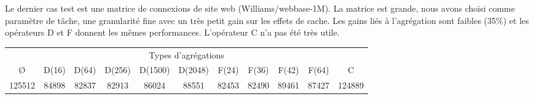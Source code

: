 Le dernier cas test est une matrice de connexions de site web (Williams/webbase-1M).
%
La matrice est grande, nous avons choisi comme paramètre de tâche, une granularité fine avec un très petit gain sur les effets de cache.
%
Les gains liés à l'agrégation sont faibles (35\%) et les opérateurs D et F donnent les mêmes performances.
%
L'opérateur C n'a pas été très utile.


\begin{center}
  \begin{tabular}{|c|c|c|c|c|c|c|c|c|c|c|}
    \hline
    \multicolumn{11}{|c|}{Types d'agrégations}\\
    \O & D(16) & D(64) & D(256) & D(1500) & D(2048) & F(24) & F(36) & F(42) & F(64) & C \\
    \hline
    125512 & 84898 & 82837 & 82913 & 86024 & 88551 & 82453 & 82490 & 89461 & 87427 & 124889 \\
    \hline
  \end{tabular}
  \label{tab:webbase}
\end{center}

